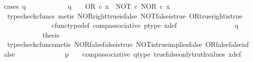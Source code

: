 \begin{isabellebody}
{\isacharparenleft}{\kern0pt}cases\ {\isachardoublequoteopen}q\ {\isacharequal}{\kern0pt}\ {\isasymt}{\isachardoublequoteclose}{\isacharparenright}{\kern0pt}\isanewline
\ \ \ \ \ \ \ \ \isamarkupfalse%
\ {\isachardoublequoteopen}q\ {\isacharequal}{\kern0pt}\ {\isasymt}\ {\isasymLongrightarrow}\ OR\ {\isasymcirc}\isactrlsub c\ x\ {\isacharequal}{\kern0pt}\ {\isacharparenleft}{\kern0pt}NOT\ {\isasymcirc}\isactrlsub c\ NOR{\isacharparenright}{\kern0pt}\ {\isasymcirc}\isactrlsub c\ x{\isachardoublequoteclose}\isanewline
\ \ \ \ \ \ \ \ \ \ \isamarkupfalse%
\ {\isacharparenleft}{\kern0pt}typecheck{\isacharunderscore}{\kern0pt}cfuncs{\isacharcomma}{\kern0pt}\ metis\ NOR{\isacharunderscore}{\kern0pt}right{\isacharunderscore}{\kern0pt}true{\isacharunderscore}{\kern0pt}is{\isacharunderscore}{\kern0pt}false\ NOT{\isacharunderscore}{\kern0pt}false{\isacharunderscore}{\kern0pt}is{\isacharunderscore}{\kern0pt}true\ OR{\isacharunderscore}{\kern0pt}true{\isacharunderscore}{\kern0pt}right{\isacharunderscore}{\kern0pt}is{\isacharunderscore}{\kern0pt}true\ \isanewline
\ \ \ \ \ \ \ \ \ \ \ \ \ \ cfunc{\isacharunderscore}{\kern0pt}type{\isacharunderscore}{\kern0pt}def\ comp{\isacharunderscore}{\kern0pt}associative\ p{\isacharunderscore}{\kern0pt}type\ x{\isacharunderscore}{\kern0pt}def{\isacharparenright}{\kern0pt}\isanewline
\ \ \ \ \ \ \isamarkupfalse%
\isanewline
\ \ \ \ \ \ \ \ \isamarkupfalse%
\ {\isachardoublequoteopen}q\ {\isasymnoteq}\ {\isasymt}{\isachardoublequoteclose}\isanewline
\ \ \ \ \ \ \ \ \isamarkupfalse%
\ \isamarkupfalse%
\ {\isacharquery}{\kern0pt}thesis\isanewline
\ \ \ \ \ \ \ \ \ \ \isamarkupfalse%
\ {\isacharparenleft}{\kern0pt}typecheck{\isacharunderscore}{\kern0pt}cfuncs{\isacharcomma}{\kern0pt}metis\ NOR{\isacharunderscore}{\kern0pt}false{\isacharunderscore}{\kern0pt}false{\isacharunderscore}{\kern0pt}is{\isacharunderscore}{\kern0pt}true\ NOT{\isacharunderscore}{\kern0pt}is{\isacharunderscore}{\kern0pt}true{\isacharunderscore}{\kern0pt}implies{\isacharunderscore}{\kern0pt}false\ OR{\isacharunderscore}{\kern0pt}false{\isacharunderscore}{\kern0pt}false{\isacharunderscore}{\kern0pt}is{\isacharunderscore}{\kern0pt}false\isanewline
\ \ \ \ \ \ \ \ \ \ \ \ \ \ {\isacartoucheopen}p\ {\isacharequal}{\kern0pt}\ {\isasymf}{\isacartoucheclose}\ \ comp{\isacharunderscore}{\kern0pt}associative{}\ q{\isacharunderscore}{\kern0pt}type\ true{\isacharunderscore}{\kern0pt}false{\isacharunderscore}{\kern0pt}only{\isacharunderscore}{\kern0pt}truth{\isacharunderscore}{\kern0pt}values\ x{\isacharunderscore}{\kern0pt}def{\isacharparenright}{\kern0pt}\isanewline

\end{isabellebody}
